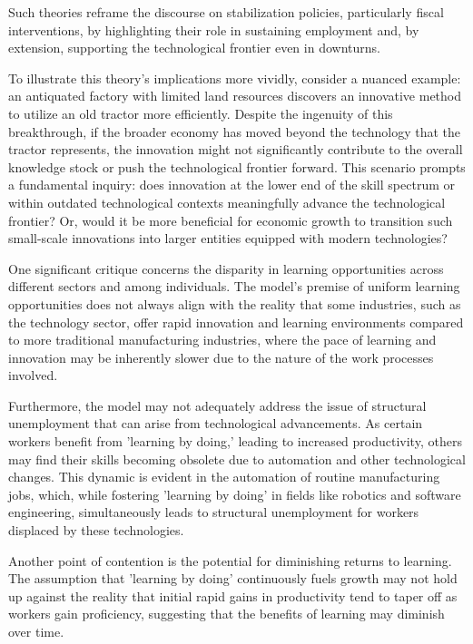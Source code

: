 \documentclass[12pt]{report}
\begin{document}
Such theories reframe the discourse on stabilization policies, particularly fiscal interventions, by highlighting their
role in sustaining employment and, by extension, supporting the technological frontier even in downturns. 

To illustrate this theory's implications more vividly, consider a nuanced example: an antiquated factory with limited
land resources discovers an innovative method to utilize an old tractor more efficiently. Despite the ingenuity of this
breakthrough, if the broader economy has moved beyond the technology that the tractor represents, the innovation might
not significantly contribute to the overall knowledge stock or push the technological frontier forward. This scenario
prompts a fundamental inquiry: does innovation at the lower end of the skill spectrum or within outdated technological
contexts meaningfully advance the technological frontier? Or, would it be more beneficial for economic growth to
transition such small-scale innovations into larger entities equipped with modern technologies? 

One significant critique concerns the disparity in learning opportunities across different sectors and among
individuals. The model's premise of uniform learning opportunities does not always align with the reality that some
industries, such as the technology sector, offer rapid innovation and learning environments compared to more traditional
manufacturing industries, where the pace of learning and innovation may be inherently slower due to the nature of the
work processes involved.

Furthermore, the model may not adequately address the issue of structural unemployment that can arise from technological
advancements. As certain workers benefit from 'learning by doing,' leading to increased productivity, others may find
their skills becoming obsolete due to automation and other technological changes. This dynamic is evident in the
automation of routine manufacturing jobs, which, while fostering 'learning by doing' in fields like robotics and
software engineering, simultaneously leads to structural unemployment for workers displaced by these technologies.

Another point of contention is the potential for diminishing returns to learning. The assumption that 'learning by
doing' continuously fuels growth may not hold up against the reality that initial rapid gains in productivity tend to
taper off as workers gain proficiency, suggesting that the benefits of learning may diminish over time.
\end{document}
